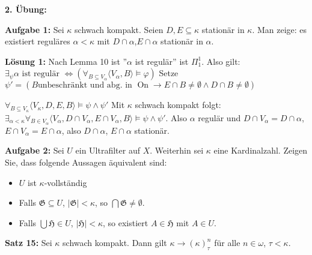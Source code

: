 \documentclass[a4paper,fontsize=11pt]{scrartcl}
\newcommand{\On}{\operatorname{On}}
\begin{document}
{\bf 2. Übung:}

{\bf Aufgabe 1:} Sei $\kappa$ schwach kompakt. Seien
$D,E\subseteq\kappa$ stationär in $\kappa$. Man zeige: es existiert
reguläres $\alpha<\kappa$ mit $D\cap\alpha$,$E\cap\alpha$ stationär in
$\alpha$.

  {\bf Lösung 1:} Nach Lemma 10 ist ''$\alpha$ ist regulär'' ist $\Pi^1_1$. Also gilt:
    $\exists_{\psi} \alpha \mbox{ ist regulär } \iff \left( \forall_{B\subseteq V_{\alpha}} \langle V_{\alpha},B\rangle\models \varphi\right)$
    Setze $\psi' = (B \mbox{unbeschränkt und abg. in } \On \to E\cap B\neq \emptyset \land D\cap B\neq \emptyset)$
    
    $\forall_{B\subseteq V_{\kappa}} \langle V_{\kappa},D,E,B\rangle\models \psi\land\psi'$
    Mit $\kappa$ schwach kompakt folgt:
    $\exists_{\alpha<\kappa} \forall_{B\in V_{\alpha}} \langle V_{\alpha},D\cap V_{\alpha}, E\cap V_{\alpha}, B\rangle \models \psi\land\psi'$.
    Also $\alpha$ regulär und $D\cap V_{\alpha}=D\cap\alpha$, $E\cap V_{\alpha}=E\cap\alpha$, also $D\cap\alpha$, $E\cap\alpha$ stationär.
   
{\bf Aufgabe 2:} Sei $U$ ein Ultrafilter auf $X$. Weiterhin sei
$\kappa$ eine Kardinalzahl. Zeigen Sie, dass folgende Aussagen
äquivalent sind:
\begin{itemize}
\item[(1)] $U$ ist $\kappa$-vollständig
\item[(2)] Falls $\mathfrak{G}\subseteq U$, $|\mathfrak{G}|<\kappa$,
  so $\bigcap\mathfrak{G}\neq\emptyset$.
\item[(3)] Falls $\bigcup\mathfrak{H}\in U$, $|\mathfrak{H}|<\kappa$,
  so existiert $A\in\mathfrak{H}$ mit $A\in U$.
\end{itemize}



{\bf Satz 15:} Sei $\kappa$ schwach kompakt. 
  Dann gilt $\kappa \to (\kappa)^n_{\tau}$ für alle $n\in \omega$, $\tau<\kappa$.
   
\end{document}
